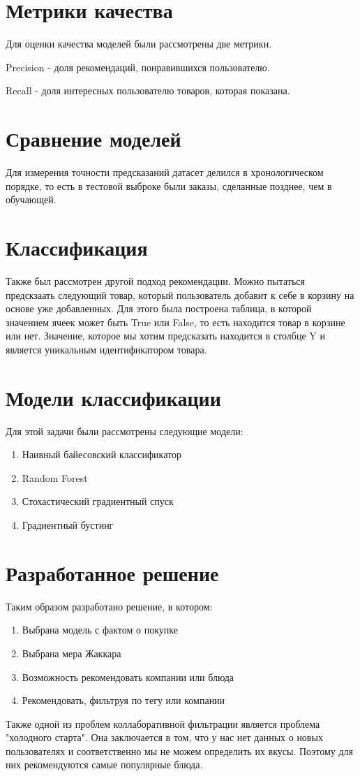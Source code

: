 \documentclass{fefu}
\begin{document}
  \section{Метрики качества}
  Для оценки качества моделей были рассмотрены две метрики.

  Precision - доля рекомендаций, понравившихся пользователю.

  Recall - доля интересных пользователю товаров, которая показана.

  \section{Сравнение моделей}
  Для измерения точности предсказаний датасет делился в хронологическом порядке,
  то есть в тестовой выброке были заказы, сделанные позднее, чем в обучающей.

  \section{Классификация}
  Также был рассмотрен другой подход рекомендации. Можно пытаться предскзаать
  следующий товар, который пользователь добавит к себе в корзину на основе уже добавленных.
  Для этого была построена таблица, в которой значением ячеек может быть True или False, то есть
  находится товар в корзине или нет. Значение, которое мы хотим предсказать находится
  в столбце Y и является уникальным идентификатором товара.

  \section{Модели классификации}
  Для этой задачи были рассмотрены следующие модели:
  \begin{enumerate}
    \item Наивный байесовский классификатор
    \item Random Forest
    \item Стохастический градиентный спуск
    \item Градиентный бустинг
  \end{enumerate}

  \section{Разработанное решение}
  Таким образом разработано решение, в котором:
  \begin{enumerate}
    \item Выбрана модель с фактом о покупке
    \item Выбрана мера Жаккара
    \item Возможность рекомендовать компании или блюда
    \item Рекомендовать, фильтруя по тегу или компании
  \end{enumerate}
  Также одной из проблем коллаборативной фильтрации является проблема "холодного старта".
  Она заключается в том, что у нас нет данных о новых пользователях и соответственно
  мы не можем определить их вкусы. Поэтому для них рекомендуются самые популярные блюда.
\end{document}
